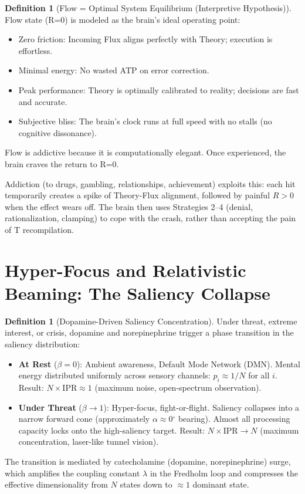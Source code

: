 \documentclass[11pt,oneside]{article}
\theoremstyle{definition}
\newtheorem{definition}[theorem]{Definition}
\begin{document}
\begin{definition}[Flow = Optimal System Equilibrium (Interpretive Hypothesis)]
Flow state (R=0) is modeled as the brain's ideal operating point:
\begin{itemize}
  \item Zero friction: Incoming Flux aligns perfectly with Theory; execution is effortless.
  \item Minimal energy: No wasted ATP on error correction.
  \item Peak performance: Theory is optimally calibrated to reality; decisions are fast and accurate.
  \item Subjective bliss: The brain's clock runs at full speed with no stalls (no cognitive dissonance).
\end{itemize}

Flow is addictive because it is computationally elegant. Once experienced, the brain craves the return to R=0.

Addiction (to drugs, gambling, relationships, achievement) exploits this: each hit temporarily creates a spike of Theory-Flux alignment, followed by painful $R > 0$ when the effect wears off. The brain then uses Strategies 2--4 (denial, rationalization, clamping) to cope with the crash, rather than accepting the pain of T recompilation.
\end{definition}

\section{Hyper-Focus and Relativistic Beaming: The Saliency Collapse}

\begin{definition}[Dopamine-Driven Saliency Concentration]
Under threat, extreme interest, or crisis, dopamine and norepinephrine trigger a phase transition in the saliency distribution:

\begin{itemize}
  \item \textbf{At Rest} ($\beta = 0$): Ambient awareness, Default Mode Network (DMN). Mental energy distributed uniformly across sensory channels: $p_i \approx 1/N$ for all $i$. Result: $N \times \text{IPR} \approx 1$ (maximum noise, open-spectrum observation).

  \item \textbf{Under Threat} ($\beta \to 1$): Hyper-focus, fight-or-flight. Saliency collapses into a narrow forward cone (approximately $\alpha \approx 0\ensuremath{^\circ}$ bearing). Almost all processing capacity locks onto the high-saliency target. Result: $N \times \text{IPR} \to N$ (maximum concentration, laser-like tunnel vision).
\end{itemize}

The transition is mediated by catecholamine (dopamine, norepinephrine) surge, which amplifies the coupling constant $\lambda$ in the Fredholm loop and compresses the effective dimensionality from $N$ states down to $\approx 1$ dominant state.
\end{definition}
\end{document}
